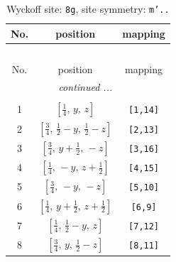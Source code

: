 \documentclass[fleqn,8pt]{jsarticle}
\begin{document}
\begin{longtable}{ccc}
\caption{Wyckoff site: {\tt 8g}, site symmetry: {\tt m'..}}
 \\
 \hline \hline
No. & position & mapping \\ \hline \endfirsthead

\multicolumn{2}{l}{\tablename\ \thetable{}} \\
 \hline \hline
No. & position & mapping \\ \hline \endhead

 \hline \hline
\multicolumn{2}{r}{\footnotesize\it continued ...} \\ \endfoot

 \hline \hline
\multicolumn{2}{r}{} \\ \endlastfoot

1 & $\left[ \frac{1}{4},\, y,\, z \right]$ & {\tt [1,14]} \\ \hline
2 & $\left[ \frac{3}{4},\, \frac{1}{2} - y,\, \frac{1}{2} - z \right]$ & {\tt [2,13]} \\ \hline
3 & $\left[ \frac{3}{4},\, y + \frac{1}{2},\, - z \right]$ & {\tt [3,16]} \\ \hline
4 & $\left[ \frac{1}{4},\, - y,\, z + \frac{1}{2} \right]$ & {\tt [4,15]} \\ \hline
5 & $\left[ \frac{3}{4},\, - y,\, - z \right]$ & {\tt [5,10]} \\ \hline
6 & $\left[ \frac{1}{4},\, y + \frac{1}{2},\, z + \frac{1}{2} \right]$ & {\tt [6,9]} \\ \hline
7 & $\left[ \frac{1}{4},\, \frac{1}{2} - y,\, z \right]$ & {\tt [7,12]} \\ \hline
8 & $\left[ \frac{3}{4},\, y,\, \frac{1}{2} - z \right]$ & {\tt [8,11]} \\
\end{longtable}
\renewcommand{\arraystretch}{1.2}
\end{document}
